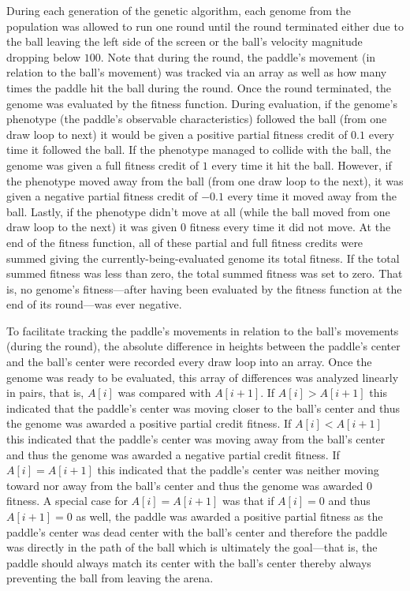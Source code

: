 During each generation of the genetic algorithm, each genome from the population was allowed to run one round until the round terminated either due to the ball leaving the left side of the screen or the ball's velocity magnitude dropping below $100$. Note that during the round, the paddle's movement (in relation to the ball's movement) was tracked via an array as well as how many times the paddle hit the ball during the round. Once the round terminated, the genome was evaluated by the fitness function. During evaluation, if the genome's phenotype (the paddle's observable characteristics) followed the ball (from one draw loop to next) it would be given a positive partial fitness credit of $0.1$ every time it followed the ball. If the phenotype managed to collide with the ball, the genome was given a full fitness credit of $1$ every time it hit the ball. However, if the phenotype moved away from the ball (from one draw loop to the next), it was given a negative partial fitness credit of $-0.1$ every time it moved away from the ball. Lastly, if the phenotype didn't move at all (while the ball moved from one draw loop to the next) it was given $0$ fitness every time it did not move. At the end of the fitness function, all of these partial and full fitness credits were summed giving the currently-being-evaluated genome its total fitness. If the total summed fitness was less than zero, the total summed fitness was set to zero. That is, no genome's fitness---after having been evaluated by the fitness function at the end of its round---was ever negative. 

To facilitate tracking the paddle's movements in relation to the ball's movements (during the round), the absolute difference in heights between the paddle's center and the ball's center were recorded every draw loop into an array. Once the genome was ready to be evaluated, this array of differences was analyzed linearly in pairs, that is, $A[i]$ was compared with $A[i+1]$. If $A[i]>A[i+1]$ this indicated that the paddle's center was moving closer to the ball's center and thus the genome was awarded a positive partial credit fitness. If $A[i]<A[i+1]$ this indicated that the paddle's center was moving away from the ball's center and thus the genome was awarded a negative partial credit fitness. If $A[i]=A[i+1]$ this indicated that the paddle's center was neither moving toward nor away from the ball's center and thus the genome was awarded $0$ fitness. A special case for $A[i]=A[i+1]$ was that if $A[i]=0$ and thus $A[i+1]=0$ as well, the paddle was awarded a positive partial fitness as the paddle's center was dead center with the ball's center and therefore the paddle was directly in the path of the ball which is ultimately the goal---that is, the paddle should always match its center with the ball's center thereby always preventing the ball from leaving the arena.

